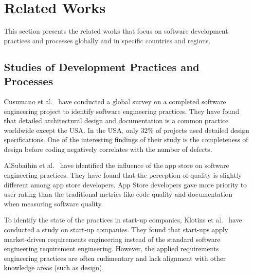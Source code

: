 \section{Related Works}
\label{related_works}
This section presents the related works that focus on software development practices and processes globally and in specific countries and regions.  

\subsection{Studies of Development Practices and Processes}
\label{dev practice study}
Cusumano et al.~\citep{Cusumano2003} have conducted a global survey on a completed software engineering project to identify software engineering practices. They have found that detailed architectural design and documentation is a common practice worldwide except the USA. In the USA, only 32\% of projects used detailed design specifications. One of the interesting findings of their study is the completeness of design before coding negatively correlates with the number of defects.

AlSubaihin et al.~\citep{AlSubaihin2019} have identified the influence of the app store on software engineering practices. They have found that the perception of quality is slightly different among app store developers. App Store developers gave more priority to user rating than the traditional metrics like code quality and documentation when measuring software quality.

To identify the state of the practices in start-up companies, Klotins et al.~\citep{Klotins2018} have conducted a study on start-up companies. They found that start-ups apply market-driven requirements engineering instead of the standard software engineering requirement engineering. However, the applied requirements engineering practices are often rudimentary and lack alignment with other knowledge areas (such as design).

